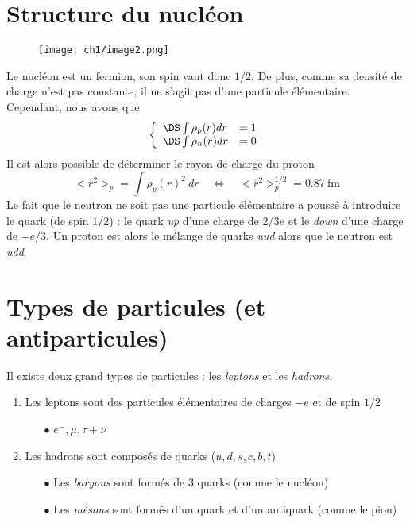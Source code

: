 \section{Structure du nucléon}
	\begin{wrapfigure}[10]{r}{6cm}
	\vspace{-8mm}
	\texttt{[image: ch1/image2.png]}
	\end{wrapfigure}
Le nucléon est un fermion, son spin vaut donc $1/2$. De plus, comme sa densité de charge n'est pas 
constante, il ne s'agit pas d'une particule élémentaire. Cependant, nous avons que
\begin{equation}
\left\{\begin{array}{ll}
\DS \int \rho_p(r)dr &=1\\
\DS \int \rho_n(r)dr &=0
\end{array}\right.
\end{equation}
Il est alors possible de déterminer le rayon de charge du proton
\begin{equation}
<r^2>_p = \int \rho_p(r)^2\ dr \quad\Leftrightarrow\quad <r^2>_p^{1/2} = 0.87\ \text{fm}
\end{equation}
Le fait que le neutron ne soit pas une particule élémentaire a poussé à introduire le quark 
(de spin $1/2$) : le quark \textit{up} d'une charge de $2/3e$ et le \textit{down} d'une charge
de $-e/3$. Un proton est alors le mélange de quarks \textit{uud} alors que le neutron est \textit{udd}.



\section{Types de particules (et antiparticules)}
Il existe deux grand types de particules : les \textit{leptons} et les \textit{hadrons}.
\begin{enumerate}
\item Les leptons sont des particules élémentaires de charges $-e$ et de spin $1/2$
	\begin{itemize}
	\item[$\bullet$] $e^-, \mu, \tau + \nu$
	\end{itemize}
\item Les hadrons sont composés de quarks ($u,d,s,c,b,t$)
	\begin{itemize}
	\item[$\bullet$] Les \textit{baryons} sont formés de 3 quarks (comme le nucléon)
	\item[$\bullet$] Les \textit{mésons} sont formés d'un quark et d'un antiquark (comme le pion)
	\end{itemize}
\end{enumerate}

